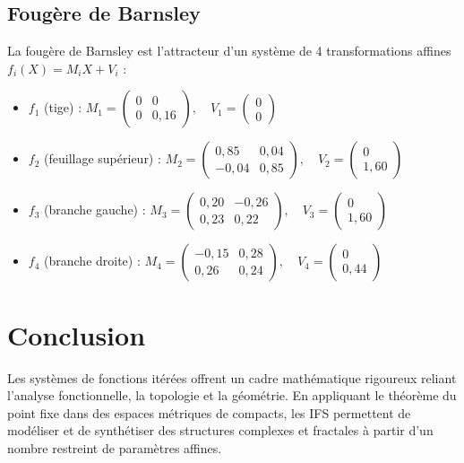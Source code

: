 \documentclass[11pt,a4paper]{article}
\begin{document}
\subsection{Fougère de Barnsley}
La fougère de Barnsley est l'attracteur d'un système de 4 transformations affines $f_i(X) = M_i X + V_i$ :
\begin{itemize}
    \item $f_1$ (tige) : $M_1 = \begin{pmatrix} 0 & 0 \\ 0 & 0{,}16 \end{pmatrix}, \quad V_1 = \begin{pmatrix} 0 \\ 0 \end{pmatrix}$
    \item $f_2$ (feuillage supérieur) : $M_2 = \begin{pmatrix} 0{,}85 & 0{,}04 \\ -0{,}04 & 0{,}85 \end{pmatrix}, \quad V_2 = \begin{pmatrix} 0 \\ 1{,}60 \end{pmatrix}$
    \item $f_3$ (branche gauche) : $M_3 = \begin{pmatrix} 0{,}20 & -0{,}26 \\ 0{,}23 & 0{,}22 \end{pmatrix}, \quad V_3 = \begin{pmatrix} 0 \\ 1{,}60 \end{pmatrix}$
    \item $f_4$ (branche droite) : $M_4 = \begin{pmatrix} -0{,}15 & 0{,}28 \\ 0{,}26 & 0{,}24 \end{pmatrix}, \quad V_4 = \begin{pmatrix} 0 \\ 0{,}44 \end{pmatrix}$
\end{itemize}

\section{Conclusion}
Les systèmes de fonctions itérées offrent un cadre mathématique rigoureux reliant l'analyse fonctionnelle, la topologie et la géométrie. En appliquant le théorème du point fixe dans des espaces métriques de compacts, les IFS permettent de modéliser et de synthétiser des structures complexes et fractales à partir d'un nombre restreint de paramètres affines.
\end{document}
